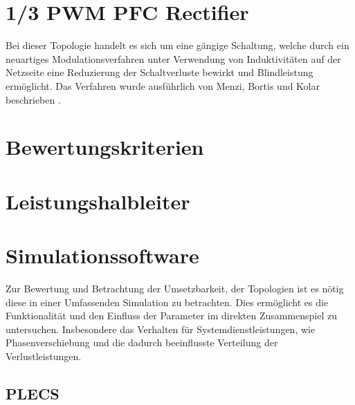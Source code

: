 \section{1/3 PWM PFC Rectifier}
Bei dieser Topologie handelt es sich um eine gängige Schaltung, welche durch ein neuartiges Modulationsverfahren unter Verwendung von Induktivitäten auf der Netzseite eine Reduzierung der Schaltverluste bewirkt und Blindleistung ermöglicht. Das Verfahren wurde ausführlich von Menzi, Bortis und Kolar beschrieben \cite{1/3PWMPFC}.


\section{Bewertungskriterien}

\section{Leistungshalbleiter}

\section{Simulationssoftware}
Zur Bewertung und Betrachtung der Umsetzbarkeit, der Topologien ist es nötig diese in einer Umfassenden Simulation zu betrachten. Dies ermöglicht es die Funktionalität und den Einfluss der Parameter im direkten Zusammenspiel zu untersuchen. Insbesondere das Verhalten für Systemdienstleistungen, wie Phasenverschiebung und die dadurch beeinflusste Verteilung der Verlustleistungen. 
	\subsection{PLECS}